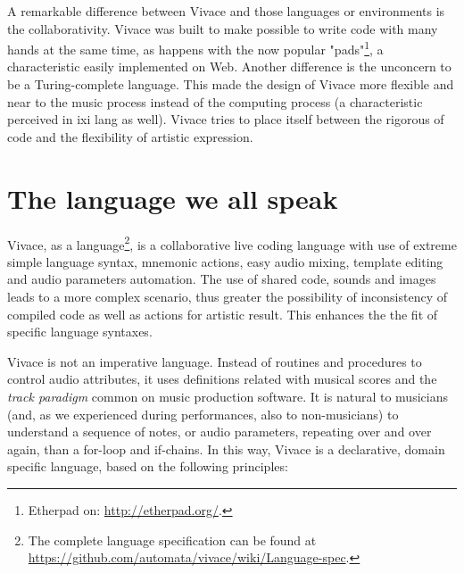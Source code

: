 \documentclass[letterpaper, 12pt]{article}
\begin{document}
A remarkable difference between Vivace and those languages or
environments is the collaborativity. Vivace was built to make possible
to write code with many hands at the same time, as happens with the
now popular "pads"\footnote{Etherpad on: \url{http://etherpad.org/}.},  a characteristic easily implemented on Web.
Another difference is the unconcern to be a
Turing-complete language. This made the design of Vivace more
flexible and near to the music process instead of the computing
process (a characteristic perceived in ixi lang as well). Vivace tries
to place itself between the rigorous of code and the flexibility of
artistic expression.


\section{The language we all speak}
Vivace, as a language\footnote{The complete language specification can
    be found at \url{https://github.com/automata/vivace/wiki/Language-spec}.},
    is a
collaborative live coding language with use of extreme simple language
syntax, mnemonic actions, easy audio mixing, template editing and
audio parameters automation. The use of shared
code, sounds and images leads to a more complex scenario, thus greater
the possibility of inconsistency of compiled code as well as actions
for artistic result. This enhances the the fit of specific language
syntaxes.

Vivace is not an imperative language. Instead of routines and
procedures to control audio attributes, it uses definitions
related with musical
scores and the \emph{track paradigm} common on music production
software. It is natural to musicians (and, as we experienced
during performances, also to non-musicians) to understand a sequence
of notes, or audio parameters, repeating over and over again, than a
for-loop and if-chains. In this way, Vivace is a declarative, domain
specific language, based on the following principles:
\end{document}
